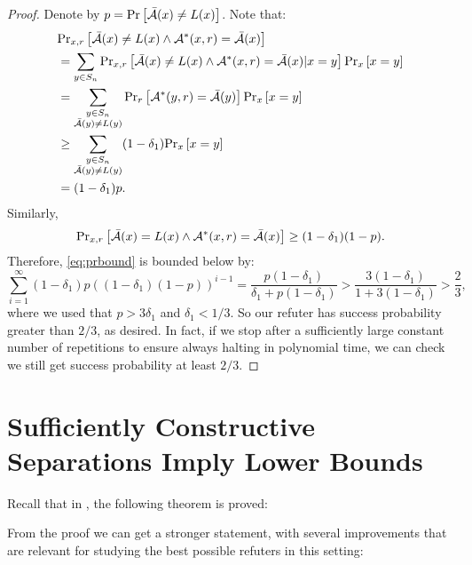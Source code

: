 \begin{proof}
    Denote by $p = \text{Pr}\left[\bar{\mathcal{A}}(x) \neq L(x)\right]$. Note that:
    \begin{align*}
         & \text{Pr}_{x,r}\left[\bar{\mathcal{A}}(x) \neq L(x) \wedge \mathcal{A}^*(x, r) = \bar{\mathcal{A}}(x)\right] \\
         & = \sum_{y\in S_n} \text{Pr}_{x, r}\left[\bar{\mathcal{A}}(x) \neq L(x) \wedge \mathcal{A}^*(x, r) = \bar{\mathcal{A}}(x) | x = y\right] \text{Pr}_{x}\left[x = y\right] \\
         & = \sum_{\substack{y\in S_n \\ \bar{\mathcal{A}}(y) \neq L(y)}} \text{Pr}_{r}\left[\mathcal{A}^*(y, r) = \bar{\mathcal{A}}(y)\right] \text{Pr}_{x}\left[x = y\right] \\
         & \geq \sum_{\substack{y\in S_n \\ \bar{\mathcal{A}}(y) \neq L(y)}} (1-\delta_1) \text{Pr}_{x}\left[x = y\right] \\
         & = (1-\delta_1)p.
    \end{align*}
    Similarly, 
    $$
        \text{Pr}_{x,r}\left[\bar{\mathcal{A}}(x) = L(x) \wedge \mathcal{A}^*(x, r) = \bar{\mathcal{A}}(x)\right] \geq (1-\delta_1)(1-p).
    $$
    Therefore, \eqref{eq:prbound} is bounded below by:
    $$
        \sum_{i=1}^{\infty} (1-\delta_1)p ((1-\delta_1)(1-p))^{i-1} = \frac{p(1-\delta_1)}{\delta_1 + p(1-\delta_1)} > \frac{3(1-\delta_1)}{1+3(1-\delta_1)} > \frac{2}{3},
    $$
    where we used that $p > 3\delta_1$ and $\delta_1 < 1/3$. So our refuter has success probability greater than $2/3$, as desired. In fact, if we stop after a
    sufficiently large constant number of 
    repetitions to ensure always halting in polynomial time, we can check we still get success probability at least $2/3$. 





        
\end{proof}



\section{Sufficiently Constructive Separations Imply Lower Bounds}

Recall that in \cite{ConstructiveSeparations}, the following theorem is proved: 

\thmcsrefuterqa*

From the proof we can get a stronger statement, with several improvements that are 
relevant for studying the best possible refuters in this setting:


